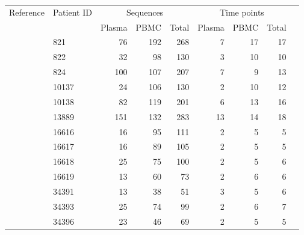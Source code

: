\documentclass[12pt]{article}
\begin{document}
\begin{table}[!ht]
\def\arraystretch{1.3}%
\begin{center}
\begin{tabular}{llrrrrrrr} 

Reference & Patient ID & \multicolumn{3}{c}{Sequences} & \multicolumn{3}{c}{Time points} \\
 &  & Plasma & PBMC & Total & Plasma & PBMC & Total\\
\hline
\cite{Shankarappa99}%
& 821 &      76 &      192 &      268 &        7 &       17 &       17 \\ 
& 822 &      32 &       98 &      130 &        3 &       10 &       10 \\ 
& 824 &     100 &      107 &      207 &        7 &        9 &       13 \\
& 10137 &     24 &      106 &      130 &        2 &       10 &       12 \\
& 10138 &     82 &      119 &      201 &        6 &       13 &       16 \\
& 13889 &    151 &      132 &      283 &       13 &       14 &       18 \\
\cite{Llewellyn06} & 16616 &     16 &       95 &      111 &        2 &        5 &        5 \\
& 16617 &     16 &       89 &      105 &        2 &        5 &        5 \\
& 16618 &     25 &       75 &      100 &        2 &        5 &        6 \\
& 16619 &     13 &       60 &       73 &        2 &        6 &        6 \\
\cite{Novitsky09}%
& 34391 &     13 &       38 &       51 &        3 &        5 &        6 \\
& 34393 &     25 &       74 &       99 &        2 &        6 &        7 \\
& 34396 &      23 &       46 &       69 &        2 &        5 &        5 \\

\end{tabular}
\end{center}
\end{table}
\end{document}
